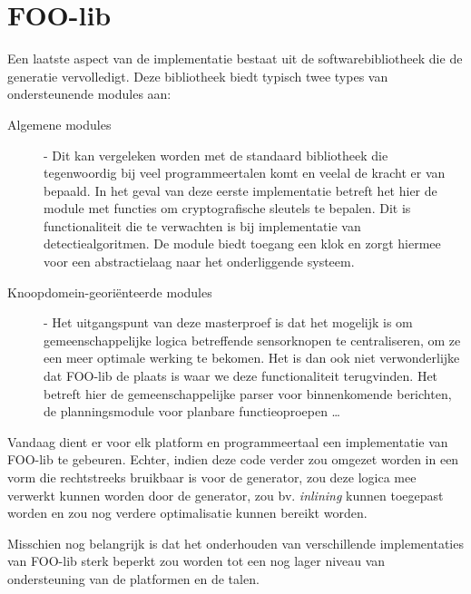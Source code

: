 
\section{FOO-lib}
\label{section:devel-foo-lib}

Een laatste aspect van de implementatie bestaat uit de softwarebibliotheek die
de generatie vervolledigt. Deze bibliotheek biedt typisch twee types van
ondersteunende modules aan:

\begin{description}

\item[Algemene modules] - Dit kan vergeleken worden met de standaard
bibliotheek die tegenwoordig bij veel programmeertalen komt en veelal de kracht
er van bepaald. In het geval van deze eerste implementatie betreft het hier de
 module met functies om cryptografische sleutels te bepalen. Dit is
functionaliteit die te verwachten is bij implementatie van detectiealgoritmen.
De  module biedt toegang een klok en zorgt hiermee voor een
abstractielaag naar het onderliggende systeem.

\item[Knoopdomein-geori\"enteerde modules] - Het uitgangspunt van deze
masterproef is dat het mogelijk is om gemeenschappelijke logica betreffende
sensorknopen te centraliseren, om ze een meer optimale werking te bekomen. Het
is dan ook niet verwonderlijke dat FOO-lib de plaats is waar we deze
functionaliteit terugvinden. Het betreft hier de gemeenschappelijke parser voor
binnenkomende berichten, de planningsmodule voor planbare functieoproepen \dots

\end{description}

Vandaag dient er voor elk platform en programmeertaal een implementatie van
FOO-lib te gebeuren. Echter, indien deze code verder zou omgezet worden in een
vorm die rechtstreeks bruikbaar is voor de generator, zou deze logica mee
verwerkt kunnen worden door de generator, zou bv. \emph{inlining} kunnen
toegepast worden en zou nog verdere optimalisatie kunnen bereikt worden.

Misschien nog belangrijk is dat het onderhouden van verschillende
implementaties van FOO-lib sterk beperkt zou worden tot een nog lager niveau
van ondersteuning van de platformen en de talen.
